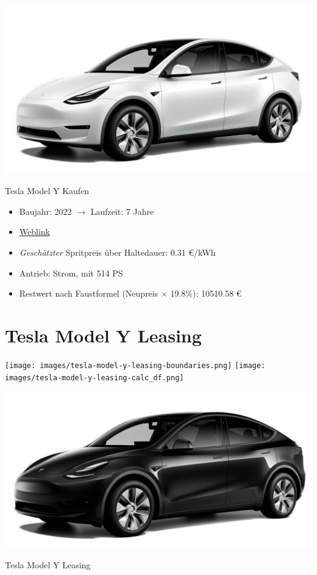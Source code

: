 \documentclass[landscape, DIV=99, 14pt]{scrartcl}
\begin{document}
\pagebreak
\null
\vspace{2cm}
\begin{center}
\includegraphics[width=0.9\columnwidth]{cars/tesla-model-y.jpg}

Tesla Model Y Kaufen
\end{center}

\begin{itemize}
    \item Baujahr: 2022 $\rightarrow$ Laufzeit: 7 Jahre
    \item \href{https://www.tesla.com/de_de/modely/design\#overview}{Weblink}
    \item \emph{Gesch\"atzter} Spritpreis \"uber Haltedauer: 0.31 \euro{}/kWh
    \item Antrieb: Strom, mit 514 PS
    \item Restwert nach Faustformel (Neupreis $\times$ 19.8\%): 10510.58 \euro{}
\end{itemize}

\pagebreak


\twocolumn

\section*{Tesla Model Y Leasing}
\begin{center}
\texttt{[image: images/tesla-model-y-leasing-boundaries.png]}
\null
\vspace{0.5cm}
\texttt{[image: images/tesla-model-y-leasing-calc\_df.png]}
\end{center}

\pagebreak
\null
\vspace{2cm}
\begin{center}
\includegraphics[width=0.9\columnwidth]{cars/tesla-model-y-leasing.jpg}

Tesla Model Y Leasing
\end{center}
\end{document}

